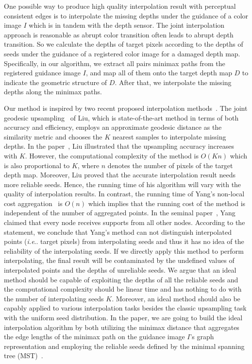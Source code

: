 \documentclass[preprint,10pt,5p,times,twocolumn]{elsarticle}
\makeatletter
\DeclareRobustCommand\onedot{\futurelet\@let@token\@onedot}
\def\@onedot{\ifx\@let@token.\else.\null\fi\xspace}
\def\ie{\emph{i.e}\onedot} \def\Ie{\emph{I.e}\onedot}
\makeatother
\begin{document}
One possible way to produce high quality interpolation result with perceptual consistent edges is to interpolate the missing depths under the guidance of a color image $I$ which is in tandem with the depth sensor. The joint interpolation approach is reasonable as abrupt color transition often leads to abrupt depth transition. So we calculate the depths of target pixels according to the depths of seeds under the guidance of a registered color image for a damaged depth map. Specifically, in our algorithm, we extract all pairs minimax paths from the registered guidance image $I$, and map all of them onto the target depth map $D$ to indicate the geometric structure of $D$. After that, we interpolate the missing depths along the minimax paths.

Our method is inspired by two recent proposed interpolation methods~\cite{Liu2013,Yang2012}. The joint geodesic upsampling~\cite{Liu2013} of Liu, which is state-of-the-art method in terms of both accuracy and efficiency, employs an approximate geodesic distance as the similarity metric and chooses the $K$ nearest samples to interpolate missing depths. In the paper~\cite{Liu2013}, Liu illustrated that the upsampling accuracy increases with $K$. However, the computational complexity of the method is $O(Kn)$ which is also proportional to $K$, where $n$ denotes the number of pixels of the target depth map. Moreover, Liu proved that the accurate interpolation result needs more reliable seeds. Hence, the running time of his algorithm will vary with the quality of interpolation results. In contrast, the running time of Yang's non-local cost aggregation~\cite{Yang2012} is $O(n)$ which implies that the running cost of the method is independent of the number of aggregated points. In the seminal paper~\cite{Yang2012}, Yang claimed that every node receives supports from all other nodes. According to the statement, we conclude that Yang's method can not distinguish interpolated points (\ie target pixels) from interpolating seeds and thus it has no idea of the reliability of the interpolating seeds. If we directly apply this method to perform interpolating, the final result will be contaminated by the undefined values of interpolated points and the depths of unreliable seeds. We argue that an ideal method should be capable of exploiting the depths of all the reliable seeds and the computational complexity should be linear time and has nothing to do with the number of interpolating seeds $K$. Moreover, an ideal method should also be capably applied to various interpolation tasks besides the classic upsampling task with the uniform seed distribution. In the paper, we are going to build the ideal interpolation algorithm by both utilizing the minimax distance that aggregates the edge lengths of the minimax path on the  guidance image $I$'s graph representation and employing the reliable seeds defined by the minimal spanning tree (MST)~\cite{Sedgewick2011}.
\end{document}

